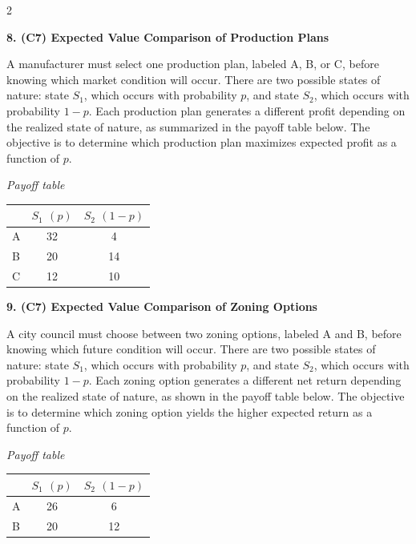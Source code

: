 \documentclass[12pt]{article}
\newcommand{\SubsectionBox}[1]{%
	\noindent\colorbox{gray!30}{%
		\parbox{\linewidth}{\textbf{#1}}%
	}\par\vspace{0.35cm}%
}
\begin{document}
\begin{multicols}{2}
		\vspace{0.25cm}
		\SubsectionBox{8. (C7) Expected Value Comparison of Production Plans}\vspace{-0.25cm}
		A manufacturer must select one production plan, labeled A, B, or C, before knowing which market condition will occur.
		There are two possible states of nature: state $S_1$, which occurs with probability $p$, and state $S_2$, which occurs with probability $1-p$.
		Each production plan generates a different profit depending on the realized state of nature, as summarized in the payoff table below.
		The objective is to determine which production plan maximizes expected profit as a function of $p$.

		\begin{center}
			\textit{Payoff table} \\
			\begin{tabular}{l c c}
				\hline
				& $S_1$ $(p)$ & $S_2$ $(1-p)$ \\
				\hline
				A & 32 & 4 \\
				B & 20 & 14 \\
				C & 12 & 10 \\
				\hline
			\end{tabular}
		\end{center}

		\vspace{0.25cm}
		\SubsectionBox{9. (C7) Expected Value Comparison of Zoning Options}\vspace{-0.25cm}
		A city council must choose between two zoning options, labeled A and B, before knowing which future condition will occur.
		There are two possible states of nature: state $S_1$, which occurs with probability $p$, and state $S_2$, which occurs with probability $1-p$.
		Each zoning option generates a different net return depending on the realized state of nature, as shown in the payoff table below.
		The objective is to determine which zoning option yields the higher expected return as a function of $p$.

		\begin{center}
			\textit{Payoff table} \\
			\begin{tabular}{l c c}
				\hline
				& $S_1$ $(p)$ & $S_2$ $(1-p)$ \\
				\hline
				A & 26 & 6 \\
				B & 20 & 12 \\
				\hline
			\end{tabular}
		\end{center}

	\end{multicols}
\end{document}
